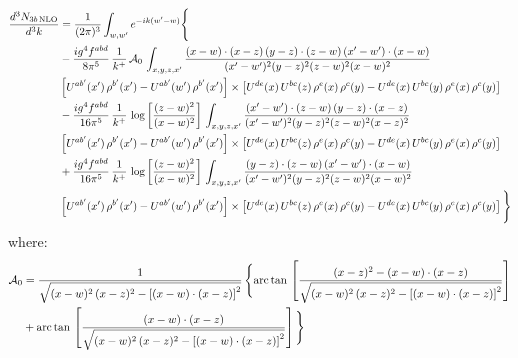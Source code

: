 \documentclass[9pt]{article}
\numberwithin{equation}{section}
\begin{document}
\begin{align}
\frac{d^{3}N_{3b\,\rm NLO}}{d^{3}k} & = \frac{1}{(2\pi)^{3}}\int_{w,w'}e^{-ik(w'-w)}\Bigg\{\notag \\
&-\frac{ig^{4}f^{abd}}{8\pi^{5}}\,\frac{1}{k^{+}}\,\mathcal{A}_{0}\,\int_{x,y,z,x'}
\frac{(x-w)\cdot(x-z)\,(y-z)\cdot(z-w)\,(x'-w')\cdot(x-w)}{(x'-w')^{2}(y-z)^{2}(z-w)^{2}(x-w)^{2}}\notag \\ & \left[U^{ab'}(x')\,\rho^{b'}(x')-U^{ab'}(w')\, \rho^{b'}(x')\right]\times \left[U^{de}(x)\,U^{bc}(z)\, \rho^{e}(x)\,\rho^{c}(y)-U^{de}(x)\,U^{bc}(y)\,\rho^{e}(x)\,\rho^{c}(y)\right] \notag \\
& -\frac{ig^{4}f^{abd}}{16\pi^{5}}\,\frac{1}{k^{+}}\,\log{\left[\frac{(z-w)^{2}}{(x-w)^{2}}\right]}\,\int_{x,y,z,x'}
\frac{(x'-w')\cdot(z-w)\,(y-z)\cdot(x-z)}{(x'-w')^{2}(y-z)^{2}(z-w)^{2}(x-z)^{2}}\notag \\
&\left[U^{ab'}(x')\,\rho^{b'}(x')-U^{ab'}(w')\, \rho^{b'}(x')\right]\times \left[U^{de}(x)\,U^{bc}(z)\, \rho^{e}(x)\,\rho^{c}(y)-U^{de}(x)\,U^{bc}(y)\,\rho^{e}(x)\,\rho^{c}(y)\right] \notag \\
&+ \frac{ig^{4}f^{abd}}{16\pi^{5}}\,\frac{1}{k^{+}}\,\log{\left[\frac{(z-w)^{2}}{(x-w)^{2}}\right]}\,\int_{x,y,z,x'}
\frac{(y-z)\cdot(z-w)\,(x'-w')\cdot(x-w)}{(x'-w')^{2}(y-z)^{2}(z-w)^{2}(x-w)^{2}}\notag \\ 
& \left[U^{ab'}(x')\,\rho^{b'}(x')-U^{ab'}(w')\, \rho^{b'}(x')\right]\times \left[U^{de}(x)\,U^{bc}(z)\, \rho^{e}(x)\,\rho^{c}(y)-U^{de}(x)\,U^{bc}(y)\,\rho^{e}(x)\,\rho^{c}(y)\right]\Bigg\}
\end{align}
where: \begin{align}
\mathcal{A}_{0} & = \frac{1}{\sqrt{(x-w)^{2}\,(x-z)^{2}-\left[(x-w)\cdot (x-z)\right]^{2}}}\, \Bigg\{\mathrm{arc\,tan}\,\left[\frac{(x-z)^{2}-(x-w)\cdot (x-z)}{\sqrt{(x-w)^{2}\,(x-z)^{2}-\left[(x-w)\cdot (x-z)\right]^{2}}}\right]\notag \\ & + \mathrm{arc\,tan}\,\left[\frac{(x-w)\cdot (x-z)}{\sqrt{(x-w)^{2}\,(x-z)^{2}-\left[(x-w)\cdot (x-z)\right]^{2}}}\right] \Bigg\}
\end{align}
\end{document}
